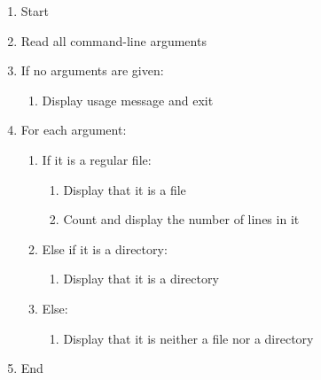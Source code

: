 \begin{enumerate}
    \item Start
    \item Read all command-line arguments
    \item If no arguments are given:
    \begin{enumerate}
        \item Display usage message and exit
    \end{enumerate}
    \item For each argument:
    \begin{enumerate}
        \item If it is a regular file:
        \begin{enumerate}
            \item Display that it is a file
            \item Count and display the number of lines in it
        \end{enumerate}
        \item Else if it is a directory:
        \begin{enumerate}
            \item Display that it is a directory
        \end{enumerate}
        \item Else:
        \begin{enumerate}
            \item Display that it is neither a file nor a directory
        \end{enumerate}
    \end{enumerate}
    \item End
\end{enumerate}

